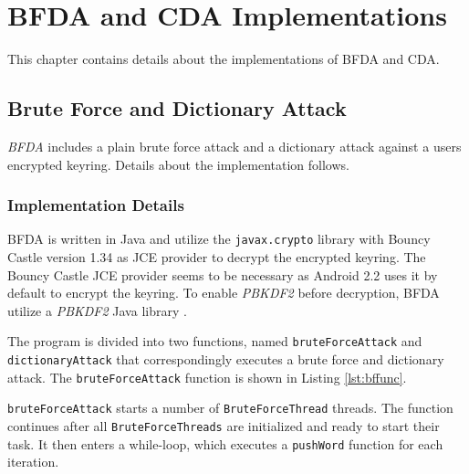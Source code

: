 \documentclass[pdftex,english,10pt,b5paper,twoside]{book}
\begin{document}


\appendix
\appendixpage
\addappheadtotoc
\chapter{\ac{BFDA} and \ac{CDA} Implementations}
\label{ap:other}

This chapter contains details about the implementations of \ac{BFDA} and
\ac{CDA}.

\section{Brute Force and Dictionary Attack}

\emph{\ac{BFDA}} includes a plain brute force attack and a dictionary attack against
a users encrypted keyring. Details about the implementation follows.

\subsection{Implementation Details}

\ac{BFDA} is written in Java and utilize the \texttt{javax.crypto} library with Bouncy
Castle version 1.34 as JCE provider to decrypt the encrypted keyring. The
Bouncy Castle JCE provider seems to be necessary as Android 2.2 uses it by
default to encrypt the keyring. To enable \emph{PBKDF2} before decryption, \ac{BFDA}
utilize a \emph{PBKDF2} Java library \cite{pbkdf2}.

The program is divided into two functions, named \texttt{bruteForceAttack} and
\texttt{dictionaryAttack} that correspondingly executes a brute force and
dictionary attack. The \texttt{bruteForceAttack} function is shown in Listing
\ref{lst:bffunc}.



\texttt{bruteForceAttack} starts a number of \texttt{BruteForceThread} threads.
The function continues after all \texttt{BruteForceThreads} are initialized and
ready to start their task. It then enters a while-loop, which executes a
\texttt{pushWord} function for each iteration.
\end{document}
